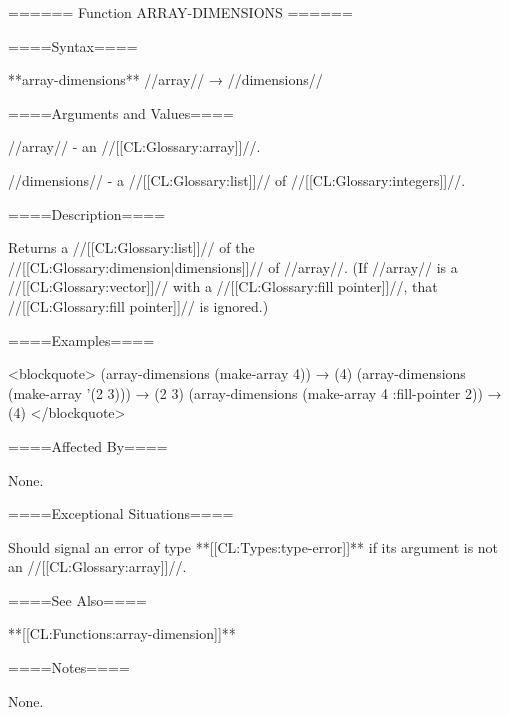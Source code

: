 ====== Function ARRAY-DIMENSIONS ======

====Syntax====

**array-dimensions** //array// → //dimensions//

====Arguments and Values====

//array// - an //[[CL:Glossary:array]]//.

//dimensions// - a //[[CL:Glossary:list]]// of //[[CL:Glossary:integers]]//.

====Description====

Returns a //[[CL:Glossary:list]]// of the //[[CL:Glossary:dimension|dimensions]]// of //array//. (If //array// is a //[[CL:Glossary:vector]]// with a //[[CL:Glossary:fill pointer]]//, that //[[CL:Glossary:fill pointer]]// is ignored.)

====Examples====

<blockquote> (array-dimensions (make-array 4)) → (4) (array-dimensions (make-array '(2 3))) → (2 3) (array-dimensions (make-array 4 :fill-pointer 2)) → (4) </blockquote>

====Affected By====

None.

====Exceptional Situations====

Should signal an error of type **[[CL:Types:type-error]]** if its argument is not an //[[CL:Glossary:array]]//.

====See Also====

**[[CL:Functions:array-dimension]]**

====Notes====

None.


